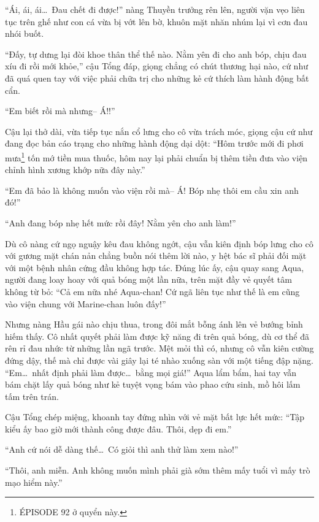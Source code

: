 \documentclass[../main.tex]{subfiles}
\begin{document}
``Ái, ái, ái\dots\ Đau chết đi được!'' nàng Thuyền trưởng rên lên, người vặn vẹo liên tục trên ghế như con cá vừa bị vớt lên bờ, khuôn mặt nhăn nhúm lại vì cơn đau nhói buốt.

``Đấy, tự dưng lại đòi khoe thân thể thế nào. Nằm yên đi cho anh bóp, chịu đau xíu đi rồi mới khỏe,'' cậu Tổng đáp, giọng chẳng có chút thương hại nào, cứ như đã quá quen tay với việc phải chữa trị cho những kẻ cứ thích làm hành động bất cẩn.

``Em biết rồi mà nhưng-- Á!!''

Cậu lại thở dài, vừa tiếp tục nắn cổ lưng cho cô vừa trách móc, giọng cậu cứ như đang đọc bản cáo trạng cho những hành động dại dột: ``Hôm trước mới đi phơi mưa\footnote{{\flaregothic ÉPISODE 92} ở quyển này.} tốn mớ tiền mua thuốc, hôm nay lại phải chuẩn bị thêm tiền đưa vào viện chỉnh hình xương khớp nữa đây này.''

``Em đã bảo là không muốn vào viện rồi mà-- Á! Bóp nhẹ thôi em cầu xin anh đó!''

``Anh đang bóp nhẹ hết mức rồi đây! Nằm yên cho anh làm!''

Dù cô nàng cứ ngọ nguậy kêu đau không ngớt, cậu vẫn kiên định bóp lưng cho cô với gương mặt chán nản chẳng buồn nói thêm lời nào, y hệt bác sĩ phải đối mặt với một bệnh nhân cứng đầu không hợp tác. Đúng lúc ấy, cậu quay sang Aqua, người đang loay hoay với quả bóng một lần nữa, trên mặt đầy vẻ quyết tâm không từ bỏ: ``Cả em nữa nhé Aqua-chan! Cứ ngã liên tục như thế là em cũng vào viện chung với Marine-chan luôn đấy!''


Nhưng nàng Hầu gái nào chịu thua, trong đôi mắt bỗng ánh lên vẻ bướng bỉnh hiếm thấy. Cô nhất quyết phải làm được kỹ năng đi trên quả bóng, dù cơ thể đã rên rỉ đau nhức từ những lần ngã trước. Mệt mỏi thì có, nhưng cô vẫn kiên cường đứng dậy, thế mà chỉ được vài giây lại té nhào xuống sàn với một tiếng đập nặng. ``Em\dots\ nhất định phải làm được\dots\ bằng mọi giá!'' Aqua lẩm bẩm, hai tay vẫn bám chặt lấy quả bóng như kẻ tuyệt vọng bám vào phao cứu sinh, mồ hôi lấm tấm trên trán.

Cậu Tổng chép miệng, khoanh tay đứng nhìn với vẻ mặt bất lực hết mức: ``Tập kiểu ấy bao giờ mới thành công được đâu. Thôi, dẹp đi em.''

``Anh cứ nói dễ dàng thế\dots\ Có giỏi thì anh thử làm xem nào!''

``Thôi, anh miễn. Anh không muốn mình phải già sớm thêm mấy tuổi vì mấy trò mạo hiểm này.''
\end{document}
